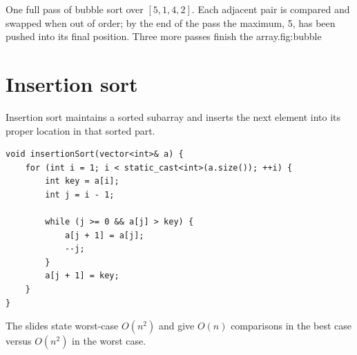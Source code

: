 \begin{utpfig}{One full pass of bubble sort over $[5,1,4,2]$. Each adjacent pair is compared
and swapped when out of order; by the end of the pass the maximum, 5, has been pushed into
its final position. Three more passes finish the array.}{fig:bubble}
\end{utpfig}

\section{Insertion sort}

Insertion sort maintains a sorted subarray and inserts the next element into its proper location in that sorted part.

\begin{lstlisting}
void insertionSort(vector<int>& a) {
    for (int i = 1; i < static_cast<int>(a.size()); ++i) {
        int key = a[i];
        int j = i - 1;

        while (j >= 0 && a[j] > key) {
            a[j + 1] = a[j];
            --j;
        }
        a[j + 1] = key;
    }
}
\end{lstlisting}

The slides state worst-case $O(n^2)$ and give $O(n)$ comparisons in the best case versus $O(n^2)$ in the worst case.

